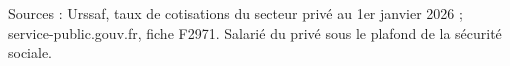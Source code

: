 Sources : Urssaf, taux de cotisations du secteur privé au 1er janvier 2026 ; service-public.gouv.fr, fiche F2971. Salarié du privé sous le plafond de la sécurité sociale.
